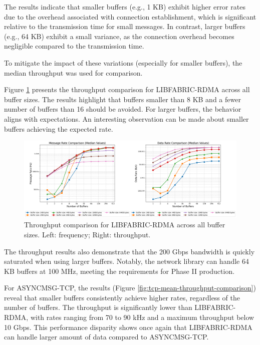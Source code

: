 The results indicate that smaller buffers (e.g., 1 KB) exhibit higher error rates due to the overhead associated with connection establishment, which is significant relative to the transmission time for small messages. In contrast, larger buffers (e.g., 64 KB) exhibit a small variance, as the connection overhead becomes negligible compared to the transmission time.

To mitigate the impact of these variations (especially for smaller buffers), the median throughput was used for comparison.

Figure \ref{fig:libfabric-mean-throughput-comparison} presents the throughput comparison for LIBFABRIC-RDMA across all buffer sizes. The results highlight that buffers smaller than 8 KB and a fewer number of buffers than 16 should be avoided. For larger buffers, the behavior aligns with expectations. 
An interesting observation can be made about smaller buffers achieving the expected rate.

\begin{figure}[htbp]
\centering
\includegraphics[width=\textwidth]{images/results/libfabric_performance_comparison.png}
\caption[Throughput comparison for LIBFABRIC-RDMA across all buffer sizes]{Throughput comparison for LIBFABRIC-RDMA across all buffer sizes. Left: frequency; Right: throughput.}
\label{fig:libfabric-mean-throughput-comparison}
\end{figure}

The throughput results also demonstrate that the 200 Gbps bandwidth is quickly saturated when using larger buffers. Notably, the network library can handle 64 KB buffers at 100 MHz, meeting the requirements for Phase II production.

For ASYNCMSG-TCP, the results (Figure \ref{fig:tcp-mean-throughput-comparison}) reveal that smaller buffers consistently achieve higher rates, regardless of the number of buffers. The throughput is significantly lower than LIBFABRIC-RDMA, with rates ranging from 70 to 90 kHz and a maximum throughput below 10 Gbps. This performance disparity shows once again that LIBFABRIC-RDMA can handle larger amount of data compared to ASYNCMSG-TCP.

